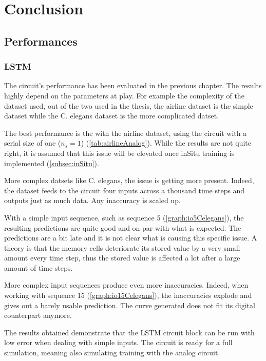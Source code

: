 \section{Conclusion}\label{sec:conc}

\subsection{Performances}

\subsubsection{\ac{LSTM}}

The circuit's performance has been evaluated in the previous chapter. The results highly depend on the parameters at play. For example the complexity of the dataset used, out of the two used in the thesis, the airline dataset is the simple dataset while the \ac{C. elegans} dataset is the more complicated datset.

The best performance is the with the airline dataset, using the circuit with a serial size of one ($n_s=1$) (\cref{tab:airlineAnalog}). While the results are not quite right, it is assumed that this issue will be elevated once inSitu training is implemented (\cref{subsec:inSitu}).

More complex datsets like \ac{C. elegans}, the issue is getting more present. Indeed, the dataset feeds to the circuit four inputs across a thousand time steps and outputs just as much data. Any inaccuracy is scaled up.

With a simple input sequence, such as sequence 5 (\cref{graph:io5Celegans}), the resulting predictions are quite good and on par with what is expected. The predictions are a bit late and it is not clear what is causing this specific issue. A theory is that the memory cells deteriorate its stored value by a very small amount every time step, thus the stored value is affected a lot after a large amount of time steps.

More complex input sequences produce even more inaccuracies. Indeed, when working with sequence 15 (\cref{graph:io15Celegans}), the inaccuracies explode and gives out a barely usable prediction. The curve generated does not fit its digital counterpart anymore.

The results obtained demonstrate that the \ac{LSTM} circuit block can be run with low error when dealing with simple inputs. The circuit is ready for a full simulation, meaning also simulating training with the analog circuit.

